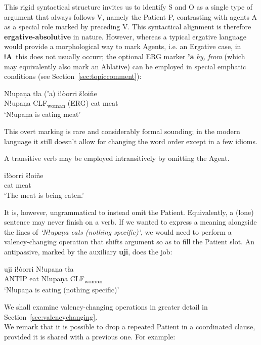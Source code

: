\documentclass[11pt]{book}
\newcommand{\qcn}[1]{\textbf{#1}}
\newcommand{\langname}{\qcn{ǂA}~}
\newcommand{\transl}[2]{\qcn{#1} \emph{#2}}
\newcommand{\grammsc}[1]{\textsc{#1}}
\newcommand{\CLF}[1]{\grammsc{CLF}\textsubscript{#1}}
\newcommand{\ERG}{\grammsc{ERG}}
\begin{document}
This rigid syntactical structure invites us to identify S and O as a single type of argument that always follows V, namely the Patient P, contrasting with agents A as a special role marked by preceding V. This syntactical alignment is therefore \textbf{ergative-absolutive} in nature. However, whereas a typical ergative language would provide a morphological way to mark Agents, i.e. an Ergative case, in \langname this does not usually occurr; the optional \ERG{} marker \transl{ʼa}{by, from} (which may equivalently also mark an Ablative) can be employed in special emphatic conditions (see Section~\ref{sec:topiccomment}):

\begin{exe}
	\ex
	\gll Nǃupaṇa 	tła  (ʼa)	iǃòorri  	šǃoiňe \\
		Nǃupaṇa 	\CLF{woman} (\ERG) 	eat 	meat\\
	\glt `Nǃupaṇa is eating meat'
\end{exe}

This overt marking is rare and considerably formal sounding; in the modern language it still doesn't allow for changing the word order except in a few idioms.

A transitive verb may be employed intransitively by omitting the Agent.

\begin{exe}
	\ex
	\gll iǃòorri 	šǃoiňe\\
eat 	meat\\
\glt `The meat is being eaten.'
\end{exe}

It is, however, ungrammatical to instead omit the Patient. Equivalently, a (lone) sentence may never finish on a verb. If we wanted to express a meaning alongside the lines of \emph{`Nǃupaṇa eats (nothing specific)'}, we would need to perform a valency-changing operation that shifts argument so as to fill the Patient slot. An antipassive, marked by the auxiliary \qcn{uji}, does the job:

\begin{exe}
	\ex
	\gll  uji 	iǃòorri Nǃupaṇa 	tła  \\
	ANTIP eat	Nǃupaṇa 	\CLF{woman} 	\\
	\glt `Nǃupaṇa is eating (nothing specific)'
\end{exe}

We shall examine valency-changing operations in greater detail in Section~\ref{sec:valencychanging}.\\

We remark that it is possible to drop a repeated Patient in a coordinated clause, provided it is shared with a previous one. For example:
\end{document}
